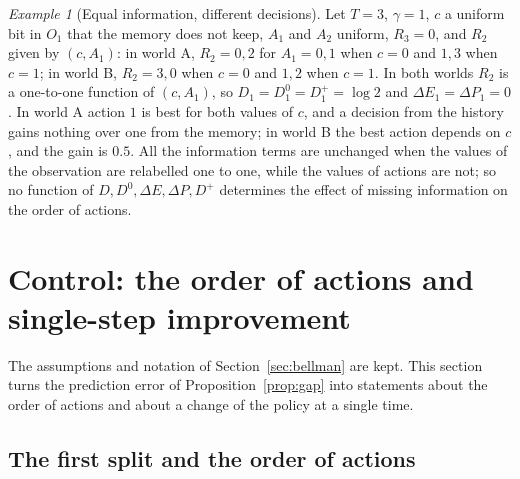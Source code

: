 \documentclass{article}
\theoremstyle{definition}
\theoremstyle{remark}
\newtheorem{example}[proposition]{Example}
\newcommand{\dE}{\Delta E}
\newcommand{\dP}{\Delta P}
\begin{document}
\begin{example}[Equal information, different decisions]\label{ex:ab}
Let $T=3$, $\gamma=1$, $c$ a uniform bit in $O_1$ that the memory does not keep, $A_1$ and $A_2$ uniform, $R_3=0$, and $R_2$ given by $(c,A_1)$: in world A, $R_2=0,2$ for $A_1=0,1$ when $c=0$ and $1,3$ when $c=1$; in world B, $R_2=3,0$ when $c=0$ and $1,2$ when $c=1$. In both worlds $R_2$ is a one-to-one function of $(c,A_1)$, so $D_1=D^0_1=D^+_1=\log2$ and $\dE_1=\dP_1=0$. In world A action $1$ is best for both values of $c$, and a decision from the history gains nothing over one from the memory; in world B the best action depends on $c$, and the gain is $0.5$. All the information terms are unchanged when the values of the observation are relabelled one to one, while the values of actions are not; so no function of $D,D^0,\dE,\dP,D^+$ determines the effect of missing information on the order of actions.
\end{example}

\section{Control: the order of actions and single-step improvement}\label{sec:prelim}

The assumptions and notation of Section~\ref{sec:bellman} are kept. This section turns the prediction error of Proposition~\ref{prop:gap} into statements about the order of actions and about a change of the policy at a single time.

\subsection{The first split and the order of actions}
\end{document}
